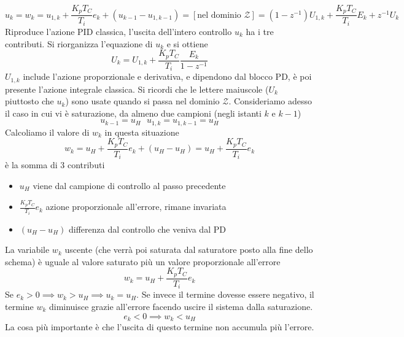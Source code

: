 \documentclass[10pt, letterpaper]{report}
\begin{document}
$$ u_k=w_k=u_{1,k}+\frac{K_pT_C}{T_i}e_k+(u_{k-1}-u_{1,k-1})=[\text{nel dominio }\mathcal{Z}]=(1-z^{-1})U_{1,k}+\frac{K_pT_C}{T_i}E_k+z^{-1}U_k$$
Riproduce l'azione PID classica, l'uscita dell'intero controllo $u_k$ ha i tre contributi. Si riorganizza l'equazione di $u_k$ e si ottiene 
$$ U_k=U_{1,k}+\frac{K_pT_C}{T_i}\frac{E_k}{1-z^{-1}}$$
$U_{1,k}$ include l'azione proporzionale e derivativa, e dipendono dal blocco PD, è poi presente l'azione integrale classica. Si ricordi che le lettere maiuscole ($U_k$ piuttosto che $u_k$) sono usate quando si passa nel dominio $\mathcal{Z}$.\acc 
Consideriamo adesso il caso in cui vi è saturazione, da almeno due campioni (negli istanti $k$ e $k-1$)
 $$u_{k-1}=u_H \ \ \ u_{1,k}=u_{1,k-1}=u_H $$
Calcoliamo il valore di $w_k$ in questa situazione 
$$ 
w_k=u_H+\frac{K_pT_C}{T_i}e_k+(u_H-u_H)=u_H+\frac{K_pT_C}{T_i}e_k
$$
è la somma di 3 contributi\begin{itemize}
    \item $u_H$ viene dal campione di controllo al passo precedente
    \item $\frac{K_pT_C}{T_i}e_k$ azione proporzionale all'errore, rimane invariata
    \item $(u_H-u_H)$ differenza dal controllo che veniva dal PD
\end{itemize}
La variabile $w_k$ uscente (che verrà poi saturata dal saturatore posto alla fine dello schema) è uguale al valore saturato più un valore proporzionale all'errore 
$$ 
w_k=u_H+\frac{K_pT_C}{T_i}e_k
$$
Se $e_k>0\implies w_k>u_H\implies u_k = u_H$. Se invece il termine dovesse essere negativo, il termine $w_k$ diminuisce grazie all'errore facendo uscire il sistema dalla saturazione. 
$$ e_k<0\implies w_k<u_H$$
La cosa più importante è che l'uscita di questo termine non accumula più l'errore.
\flowerLine 
\end{document}
